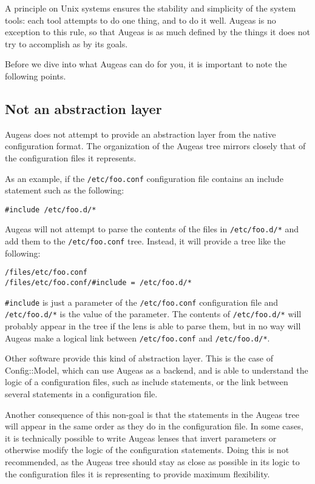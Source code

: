A principle on Unix systems ensures the stability and simplicity of the system tools: each tool attempts to do one thing, and to do it well. Augeas is no exception to this rule, so that Augeas is as much defined by the things it does not try to accomplish as by its goals.

Before we dive into what Augeas can do for you, it is important to note the following points.

\subsection{Not an abstraction layer}

Augeas does not attempt to provide an abstraction layer from the native configuration format. The organization of the Augeas tree mirrors closely that of the configuration files it represents.

As an example, if the \nolinkurl{/etc/foo.conf} configuration file contains an include statement such as the following:

\begin{verbatim}
#include /etc/foo.d/*
\end{verbatim}

Augeas will not attempt to parse the contents of the files in \nolinkurl{/etc/foo.d/*} and add them to the \nolinkurl{/etc/foo.conf} tree. Instead, it will provide a tree like the following:

\begin{verbatim}
/files/etc/foo.conf
/files/etc/foo.conf/#include = /etc/foo.d/*
\end{verbatim}

\verb!#include! is just a parameter of the \nolinkurl{/etc/foo.conf} configuration file and \nolinkurl{/etc/foo.d/*} is the value of the parameter. The contents of \nolinkurl{/etc/foo.d/*} will probably appear in the tree if the lens is able to parse them, but in no way will Augeas make a logical link between \nolinkurl{/etc/foo.conf} and \nolinkurl{/etc/foo.d/*}.

Other software provide this kind of abstraction layer. This is the case of Config::Model, which can use Augeas as a backend, and is able to understand the logic of a configuration files, such as include statements, or the link between several statements in a configuration file.

Another consequence of this non-goal is that the statements in the Augeas tree will appear in the same order as they do in the configuration file. In some cases, it is technically possible to write Augeas lenses that invert parameters or otherwise modify the logic of the configuration statements. Doing this is not recommended, as the Augeas tree should stay as close as possible in its logic to the configuration files it is representing to provide maximum flexibility.

